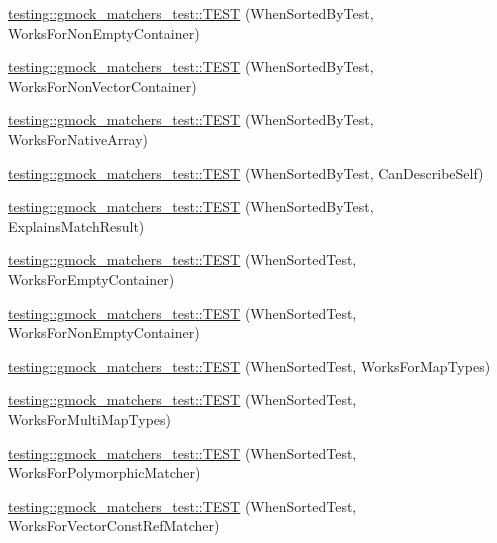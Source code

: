 \begin{DoxyCompactItemize}
\item 
\hyperlink{namespacetesting_1_1gmock__matchers__test_a3095e5533ec12a67377dec6b0769d9a8}{testing\+::gmock\+\_\+matchers\+\_\+test\+::\+T\+E\+ST} (When\+Sorted\+By\+Test, Works\+For\+Non\+Empty\+Container)
\item 
\hyperlink{namespacetesting_1_1gmock__matchers__test_a24d3caacabfef918b7a5b9dacc5e3a66}{testing\+::gmock\+\_\+matchers\+\_\+test\+::\+T\+E\+ST} (When\+Sorted\+By\+Test, Works\+For\+Non\+Vector\+Container)
\item 
\hyperlink{namespacetesting_1_1gmock__matchers__test_a33b65fc6db83270b5c29073dbbf69c4e}{testing\+::gmock\+\_\+matchers\+\_\+test\+::\+T\+E\+ST} (When\+Sorted\+By\+Test, Works\+For\+Native\+Array)
\item 
\hyperlink{namespacetesting_1_1gmock__matchers__test_afc2d1e86837d8e3103748cb2e96b61c3}{testing\+::gmock\+\_\+matchers\+\_\+test\+::\+T\+E\+ST} (When\+Sorted\+By\+Test, Can\+Describe\+Self)
\item 
\hyperlink{namespacetesting_1_1gmock__matchers__test_ada0850ab21beccb47802aab36c06d163}{testing\+::gmock\+\_\+matchers\+\_\+test\+::\+T\+E\+ST} (When\+Sorted\+By\+Test, Explains\+Match\+Result)
\item 
\hyperlink{namespacetesting_1_1gmock__matchers__test_a76aaffd49c78fdee18f11fae5ea3f6fb}{testing\+::gmock\+\_\+matchers\+\_\+test\+::\+T\+E\+ST} (When\+Sorted\+Test, Works\+For\+Empty\+Container)
\item 
\hyperlink{namespacetesting_1_1gmock__matchers__test_a2bfbef7e777d319e3d96fc98340bb558}{testing\+::gmock\+\_\+matchers\+\_\+test\+::\+T\+E\+ST} (When\+Sorted\+Test, Works\+For\+Non\+Empty\+Container)
\item 
\hyperlink{namespacetesting_1_1gmock__matchers__test_acc4a96f3aa369fda8f554f5ac4495f4b}{testing\+::gmock\+\_\+matchers\+\_\+test\+::\+T\+E\+ST} (When\+Sorted\+Test, Works\+For\+Map\+Types)
\item 
\hyperlink{namespacetesting_1_1gmock__matchers__test_ab5de36ad02781be67163ae24d08b5454}{testing\+::gmock\+\_\+matchers\+\_\+test\+::\+T\+E\+ST} (When\+Sorted\+Test, Works\+For\+Multi\+Map\+Types)
\item 
\hyperlink{namespacetesting_1_1gmock__matchers__test_a587c3799433426782ccdcfe5cb07f5bc}{testing\+::gmock\+\_\+matchers\+\_\+test\+::\+T\+E\+ST} (When\+Sorted\+Test, Works\+For\+Polymorphic\+Matcher)
\item 
\hyperlink{namespacetesting_1_1gmock__matchers__test_a0975bae51ce06a819dc1437134fd7f05}{testing\+::gmock\+\_\+matchers\+\_\+test\+::\+T\+E\+ST} (When\+Sorted\+Test, Works\+For\+Vector\+Const\+Ref\+Matcher)

\end{DoxyCompactItemize}

